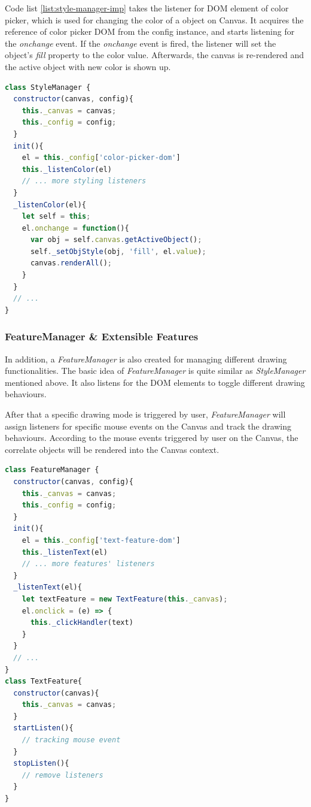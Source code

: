 Code list \ref{list:style-manager-imp} takes the listener for DOM element of color picker, which is used for changing the color of a object on Canvas. It acquires the reference of color picker DOM from the config instance, and starts listening for the \textit{onchange} event. If the \textit{onchange} event is fired, the listener will set the object's \textit{fill} property to the color value. Afterwards, the canvas is re-rendered and the active object with new color is shown up.

\begin{lstlisting}[language=JavaScript, caption=Main process of StyleManager, label={list:style-manager-imp}]
class StyleManager {
  constructor(canvas, config){
    this._canvas = canvas;
    this._config = config;
  }
  init(){
    el = this._config['color-picker-dom']
    this._listenColor(el)
    // ... more styling listeners
  }
  _listenColor(el){
    let self = this;
    el.onchange = function(){
      var obj = self.canvas.getActiveObject();
      self._setObjStyle(obj, 'fill', el.value);
      canvas.renderAll();
    }
  }
  // ...
}
\end{lstlisting}


\subsubsection{FeatureManager \& Extensible Features}

In addition, a \textit{FeatureManager} is also created for managing different drawing functionalities. The basic idea of \textit{FeatureManager} is quite similar as \textit{StyleManager} mentioned above. It also listens for the DOM elements to toggle different drawing behaviours.

After that a specific drawing mode is triggered by user, \textit{FeatureManager} will assign listeners for specific mouse events on the Canvas and track the drawing behaviours. According to the mouse events triggered by user on the Canvas, the correlate objects will be rendered into the Canvas context.

\begin{lstlisting}[language=JavaScript, caption=Main process of FeatureManager, label={list:feature-manager-imp}]
class FeatureManager {
  constructor(canvas, config){
    this._canvas = canvas;
    this._config = config;
  }
  init(){
    el = this._config['text-feature-dom']
    this._listenText(el)
    // ... more features' listeners
  }
  _listenText(el){
    let textFeature = new TextFeature(this._canvas);
    el.onclick = (e) => { 
      this._clickHandler(text)
    }
  }
  // ...
}
class TextFeature{
  constructor(canvas){
    this._canvas = canvas;
  }
  startListen(){
    // tracking mouse event
  }
  stopListen(){
    // remove listeners
  }
}
\end{lstlisting}

